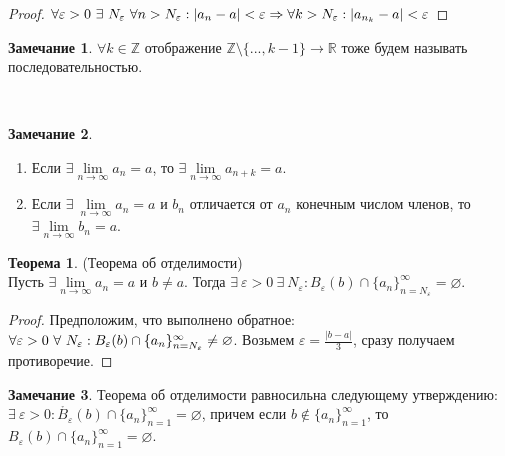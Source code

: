 \documentclass[a4paper, 12pt]{article}
\newcommand{\Z}{\mathbb{Z}}
\newcommand{\R}{\mathbb{R}}
\renewcommand{\epsilon}{\varepsilon}
\renewcommand{\emptyset}{\varnothing}
\newcommand\tab[1][.5cm]{\hspace*{#1}}
\newcommand{\lims}{\lim\limits_{n\to \infty}}
\theoremstyle{definition}
\newtheorem*{theorem}{Теорема}
\newtheorem*{comm}{Замечание}
\begin{document}
        \begin{proof}
            $\forall \epsilon>0\ \exists\ N_{\epsilon}\ \forall n>N_{\epsilon}: |a_n-a|<\epsilon \Rightarrow \forall k>N_{\epsilon}:\\ |a_{n_k}-a|<\epsilon$
        \end{proof} 
        \begin{comm}
            $\forall k\in \Z$ отображение $\Z \setminus \{..., k-1\} \to \R$ тоже будем называть последовательностью.
        \end{comm} 
        \
        \begin{comm}\tab
            \begin{enumerate}
                \item Если $\exists \lims a_n=a$, то $\exists \lims a_{n+k}=a$.
                \item Если $\exists\ \lims a_n=a$ и $b_n$ отличается от $a_n$ конечным числом членов, то $\exists \lims b_n=a$.
            \end{enumerate}
        \end{comm} 
        \begin{theorem} (Теорема об отделимости)\\
            Пусть $\exists \lims a_n=a$ и $b\ne a$. Тогда $\exists\ \epsilon>0\ \exists\ N_{\epsilon}: B_{\epsilon}(b)\cap \{a_n\}_{n=N_{\epsilon}}^{\infty}=\emptyset$.
        \end{theorem} 
        \begin{proof}
            Предположим, что выполнено обратное: $\forall \epsilon>0\ \forall \ N_{\epsilon}:\\
            B_{\epsilon}(b)\cap \{a_n\}_{n=N_{\epsilon}}^{\infty}\ne \emptyset$. Возьмем $\epsilon = \frac{|b-a|}{3}$, сразу получаем противоречие.
        \end{proof} 
        \begin{comm}
            Теорема об отделимости равносильна следующему утверждению: $\exists\ \epsilon>0: \mathring{B_{\epsilon}}(b)\cap \{a_n\}_{n=1}^{\infty}=\emptyset$, причем если $b\notin \{a_n\}_{n=1}^{\infty}$, то $B_{\epsilon}(b)\cap\{a_n\}_{n=1}^{\infty}=\emptyset$.
        \end{comm} 
\end{document}
